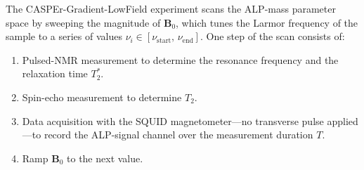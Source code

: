 The CASPEr-Gradient-LowField experiment scans the ALP-mass parameter space by sweeping the magnitude of $\boldsymbol{B}_0$, which tunes the Larmor frequency of the sample to a series of values $\nu_i \in [\nu_{\mathrm{start}},\,\nu_{\mathrm{end}}]$.
One step of the scan consists of:
\begin{enumerate}[label=\Alph*.]
    \item Pulsed-NMR measurement to determine the resonance frequency and the relaxation time $T_2^*$.
    \item Spin-echo measurement to determine $T_2$.
    \item Data acquisition with the SQUID magnetometer---no transverse pulse applied---to record the ALP-signal channel over the measurement duration $T$.
    \item Ramp $\boldsymbol{B}_0$ to the next value.
\end{enumerate}
